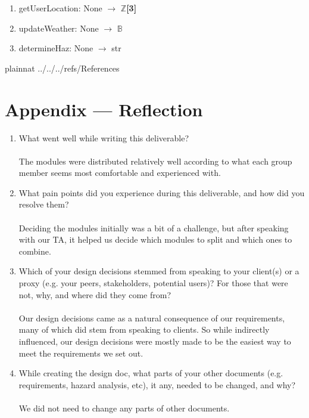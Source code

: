 \documentclass[12pt, titlepage]{article}
\begin{document}
\begin{enumerate}
  \item getUserLocation: None $\rightarrow$ $\mathbb{Z}$\textbf{[3]}
  \item updateWeather: None $\rightarrow$ $\mathbb{B}$
  \item determineHaz: None $\rightarrow$ str
\end{enumerate}

\newpage

 {plainnat}
 {../../../refs/References}

\section*{Appendix --- Reflection}

\begin{enumerate}
  \item What went well while writing this deliverable? \\ \\
        The modules were distributed relatively well according to what each group member seems most comfortable and experienced with. \\
  \item What pain points did you experience during this deliverable, and how
        did you resolve them?\\ \\
        Deciding the modules initially was a bit of a challenge, but after speaking with our TA, it helped us decide which modules to split and which ones to combine. \\
  \item Which of your design decisions stemmed from speaking to your client(s)
        or a proxy (e.g. your peers, stakeholders, potential users)? For those that
        were not, why, and where did they come from?\\ \\
        Our design decisions came as a natural consequence of our requirements, many of which did stem from speaking to clients.
        So while indirectly influenced, our design decisions were mostly made to be the easiest way to meet the requirements we set out. \\
  \item While creating the design doc, what parts of your other documents (e.g.
        requirements, hazard analysis, etc), it any, needed to be changed, and why?\\ \\
        We did not need to change any parts of other documents. \\


\end{enumerate}
\end{document}

